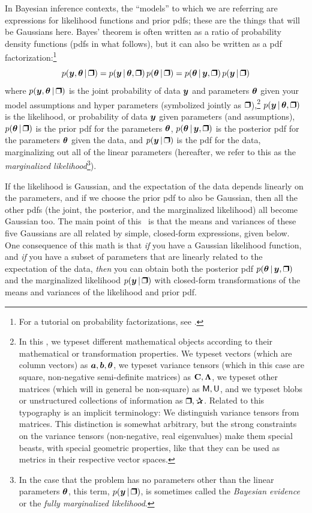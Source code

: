 In Bayesian inference contexts, the ``models'' to which we are referring are
expressions for likelihood functions and prior pdfs; these are the things
that will be Gaussians here.
Bayes' theorem is often written as a ratio of probability density functions
(pdfs in what follows), but it can also be written as a pdf factorization:\footnote{For
  a tutorial on probability factorizations, see \cite{probcalc}.}
\begin{equation}\label{eq:bayes}
p(\vy,\vtheta\given\bH) = p(\vy\given\vtheta,\bH)\,p(\vtheta\given\bH) = p(\vtheta\given\vy,\bH)\,p(\vy\given\bH)
\end{equation}
where
$p(\vy,\vtheta\given\bH)$ is the joint probability of data $\boldsymbol{y}$ and
parameters $\boldsymbol{\theta}$ given your model assumptions and hyper parameters
(symbolized jointly as $\bH$),\footnote{%
  In this \documentname, we typeset different mathematical objects according to their mathematical or transformation properties.
  We typeset vectors (which are column vectors) as $\boldsymbol{a}, \boldsymbol{b}, \boldsymbol{\theta}$,
  we typeset variance tensors (which in this case are square, non-negative semi-definite matrices) as $\mathbf{C}, \mathbf{\Lambda}$,
  we typeset other matrices (which will in general be non-square) as $\mathsf{M}, \mathsf{U}$,
  and we typeset blobs or unstructured
  collections of information as $\bH, \bP$.
  Related to this typography is an implicit terminology:
  We distinguish variance tensors from matrices.
  This distinction is somewhat arbitrary, but the strong constraints on the
  variance tensors (non-negative, real eigenvalues) make them special beasts,
  with special geometric properties, like that they can be used as metrics
  in their respective vector spaces.}
$p(\vy\given\vtheta,\bH)$ is the likelihood, or probability of data $\boldsymbol{y}$
given parameters (and assumptions),
$p(\vtheta\given\bH)$ is the prior pdf for the parameters $\boldsymbol{\theta}$,
$p(\vtheta\given\vy,\bH)$ is the posterior pdf for the parameters $\boldsymbol{\theta}$
given the data,
and
$p(\vy\given\bH)$ is the pdf for the data, marginalizing out all of the linear
parameters (hereafter, we refer to this as the \textsl{marginalized
likelihood}\footnote{In the case that the problem has no parameters other than
the linear parameters $\boldsymbol{\theta}$, this term, $p(\vy \given \bH)$, is sometimes
called the \textsl{Bayesian evidence} or the \textsl{fully marginalized
likelihood}.}).

If the likelihood is Gaussian, and the expectation of the data depends linearly
on the parameters, and if we choose the prior pdf to also be Gaussian, then
all the other pdfs (the joint, the posterior, and the marginalized likelihood)
all become Gaussian too.
The main point of this \documentname\ is that the means and variances of these
five Gaussians are all related by simple, closed-form expressions, given below.
One consequence of this math is that \emph{if} you have a Gaussian
likelihood function, and \emph{if} you have a subset of parameters that are
linearly related to the expectation of the data, \emph{then} you can obtain both
the posterior pdf $p(\vtheta\given\vy,\bH)$ and the marginalized likelihood
$p(\vy\given\bH)$ with closed-form transformations of the means and variances of
the likelihood and prior pdf.

